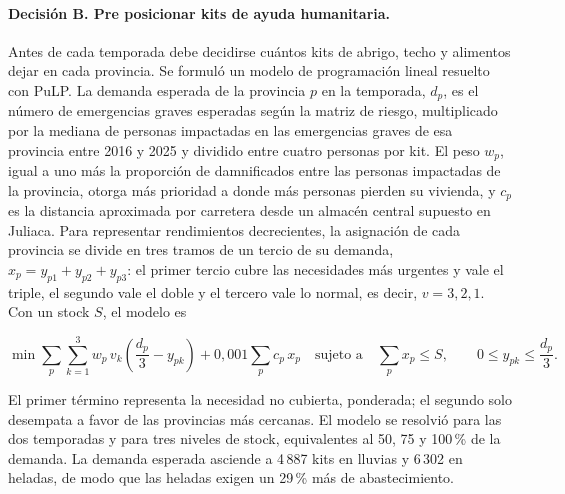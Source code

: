 \documentclass[12pt,a4paper]{article}
\begin{document}
\paragraph{Decisión B. Pre posicionar kits de ayuda humanitaria.} Antes de cada temporada debe decidirse cuántos kits
de abrigo, techo y alimentos dejar en cada provincia. Se formuló un modelo de programación lineal resuelto con
PuLP. La demanda esperada de la provincia $p$ en la temporada, $d_p$, es el número de emergencias graves esperadas
según la matriz de riesgo, multiplicado por la mediana de personas impactadas en las emergencias graves de esa
provincia entre 2016 y 2025 y dividido entre cuatro personas por kit. El peso $w_p$, igual a uno más la proporción de
damnificados entre las personas impactadas de la provincia, otorga más prioridad a donde más personas pierden su
vivienda, y $c_p$ es la distancia aproximada por carretera desde un almacén central supuesto en Juliaca. Para
representar rendimientos decrecientes, la asignación de cada provincia se divide en tres tramos de un tercio de su
demanda, $x_p=y_{p1}+y_{p2}+y_{p3}$: el primer tercio cubre las necesidades más urgentes y vale el triple, el
segundo vale el doble y el tercero vale lo normal, es decir, $v=3,2,1$. Con un stock $S$, el modelo es

\begin{equation}
\min \sum_{p}\sum_{k=1}^{3} w_p\,v_k\left(\frac{d_p}{3}-y_{pk}\right) + 0{,}001\sum_p c_p\,x_p
\quad\text{sujeto a}\quad \sum_p x_p \le S,\qquad 0\le y_{pk}\le \frac{d_p}{3}.
\end{equation}

\noindent El primer término representa la necesidad no cubierta, ponderada; el segundo solo desempata a favor de
las provincias más cercanas. El modelo se resolvió para las dos temporadas y para tres niveles de stock, equivalentes
al 50, 75 y 100\,\% de la demanda. La demanda esperada asciende a 4\,887 kits en lluvias y 6\,302 en heladas, de
modo que las heladas exigen un 29\,\% más de abastecimiento.
\end{document}
